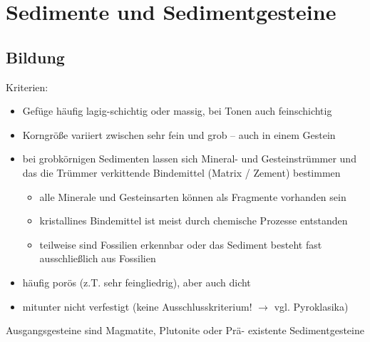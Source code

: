 \documentclass[a4, 12pt]{scrreprt}
\begin{document}
\chapter{Sedimente und Sedimentgesteine}

\section{Bildung}

Kriterien:
\begin{itemize}
\item  Gefüge häufig lagig-schichtig oder massig, bei Tonen auch feinschichtig
\item Korngröße variiert zwischen sehr fein und grob – auch in einem Gestein
\item bei grobkörnigen Sedimenten lassen sich Mineral- und Gesteinstrümmer und das
die Trümmer verkittende Bindemittel (Matrix / Zement) bestimmen
	\begin{itemize}
	\item alle Minerale und Gesteinsarten können als Fragmente vorhanden sein
	\item kristallines Bindemittel ist meist durch chemische Prozesse entstanden
	\item teilweise sind Fossilien erkennbar oder das Sediment besteht fast ausschließlich aus Fossilien
	\end{itemize}
\item häufig porös (z.T. sehr feingliedrig), aber auch dicht
\item mitunter nicht verfestigt (keine Ausschlusskriterium! $\rightarrow$ vgl. Pyroklasika)
\end{itemize}

Ausgangsgesteine sind Magmatite, Plutonite oder Prä- existente Sedimentgesteine\\
\end{document}

